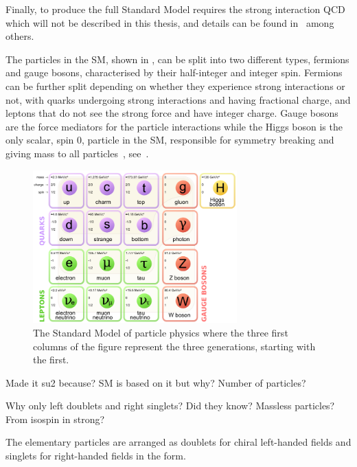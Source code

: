 
Finally, to produce the full Standard Model requires the strong interaction QCD which will not be described in this thesis, and details can be found in~\cite{13PDG} among others. 

The particles in the SM, shown in , can be split into two different types, fermions and gauge bosons, characterised by their half-integer and integer spin. Fermions can be further split depending on whether they experience strong interactions or not, with quarks undergoing strong interactions and having fractional charge, and leptons that do not see the strong force and have integer charge. Gauge bosons are the force mediators for the particle interactions while the Higgs boson is the only scalar, spin 0, particle in the SM, responsible for symmetry breaking and giving mass to all particles~\cite{35Higgs}, see~.


\begin{figure}[h!]
\includegraphics[width=0.7\textwidth]{figures/Standard_Model_of_Elementary_Particles.png}
\caption{The Standard Model of particle physics where the three first columns of the figure represent the three generations, starting with the first. \cite{33wiki1:Online}}
\label{fig:standardModel}
\end{figure}

Made it su2  because? SM is based on it but why? Number of particles?

Why only left doublets and right singlets? Did they know? Massless particles? From isospin in strong?

The elementary particles are arranged as doublets for chiral left-handed fields and singlets for right-handed fields in the form.

